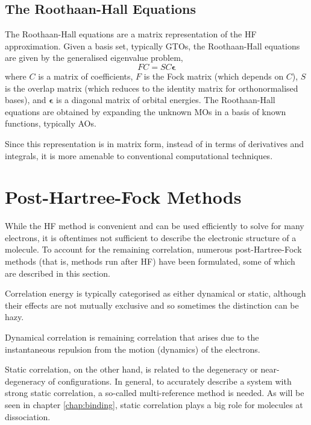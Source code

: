 \subsection{The Roothaan-Hall Equations}

The Roothaan-Hall equations are a matrix representation of the \gls{HF} approximation.\cite{roothaanNew1951,hallMolecular1997} Given a basis set, typically \glspl{GTO}, the Roothaan-Hall equations are given by the generalised eigenvalue problem,
\begin{equation}
    FC = SC\bm\epsilon
\end{equation}
where $C$ is a matrix of coefficients, $F$ is the Fock matrix (which depends on $C$), $S$ is the overlap matrix (which reduces to the identity matrix for orthonormalised bases), and $\bm\epsilon$ is a diagonal matrix of orbital energies. The Roothaan-Hall equations are obtained by expanding the unknown \glspl{MO} in a basis of known functions, typically \glspl{AO}.

Since this representation is in matrix form, instead of in terms of derivatives and integrals, it is more amenable to conventional computational techniques.

\section{Post-Hartree-Fock Methods}
\label{sec:post-hf}

While the \gls{HF} method is convenient and can be used efficiently to solve for many electrons, it is oftentimes not sufficient to describe the electronic structure of a molecule. To account for the remaining correlation, numerous post-Hartree-Fock methods (that is, methods run after \gls{HF}) have been formulated, some of which are described in this section.

Correlation energy is typically categorised as either dynamical or static, although their effects are not mutually exclusive and so sometimes the distinction can be hazy.

Dynamical correlation is remaining correlation that arises due to the instantaneous repulsion from the motion (dynamics) of the electrons.

Static correlation, on the other hand, is related to the degeneracy or near-degeneracy of configurations. In general, to accurately describe a system with strong static correlation, a so-called multi-reference method is needed. As will be seen in chapter \ref{chap:binding}, static correlation plays a big role for molecules at dissociation.

